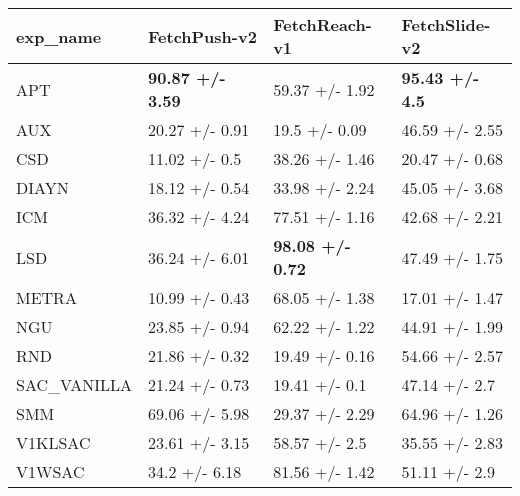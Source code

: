\begin{tabular}{llll}
\hline
 exp\_name    & FetchPush-v2            & FetchReach-v1           & FetchSlide-v2          \\
\hline
 APT         & \textbf{90.87 +/- 3.59} & 59.37 +/- 1.92          & \textbf{95.43 +/- 4.5} \\
 AUX         & 20.27 +/- 0.91          & 19.5 +/- 0.09           & 46.59 +/- 2.55         \\
 CSD         & 11.02 +/- 0.5           & 38.26 +/- 1.46          & 20.47 +/- 0.68         \\
 DIAYN       & 18.12 +/- 0.54          & 33.98 +/- 2.24          & 45.05 +/- 3.68         \\
 ICM         & 36.32 +/- 4.24          & 77.51 +/- 1.16          & 42.68 +/- 2.21         \\
 LSD         & 36.24 +/- 6.01          & \textbf{98.08 +/- 0.72} & 47.49 +/- 1.75         \\
 METRA       & 10.99 +/- 0.43          & 68.05 +/- 1.38          & 17.01 +/- 1.47         \\
 NGU         & 23.85 +/- 0.94          & 62.22 +/- 1.22          & 44.91 +/- 1.99         \\
 RND         & 21.86 +/- 0.32          & 19.49 +/- 0.16          & 54.66 +/- 2.57         \\
 SAC\_VANILLA & 21.24 +/- 0.73          & 19.41 +/- 0.1           & 47.14 +/- 2.7          \\
 SMM         & 69.06 +/- 5.98          & 29.37 +/- 2.29          & 64.96 +/- 1.26         \\
 V1KLSAC     & 23.61 +/- 3.15          & 58.57 +/- 2.5           & 35.55 +/- 2.83         \\
 V1WSAC      & 34.2 +/- 6.18           & 81.56 +/- 1.42          & 51.11 +/- 2.9          \\
\hline
\end{tabular}